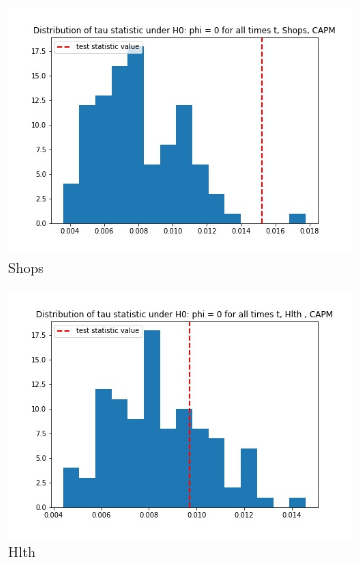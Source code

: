 \documentclass{article}
\begin{document}
\begin{figure}
  
  \begin{subfigure}[b]{0.5\textwidth}
    \centering
    \includegraphics[width=\textwidth]{Shops/tau_hist_02_CAPM.jpg}
    \caption{Shops}
    \label{fig:2}
  \end{subfigure}
  \begin{subfigure}[b]{0.5\textwidth}
    \centering
    \includegraphics[width=\textwidth]{Hlth/tau_hist_02_CAPM.jpg}
    \caption{Hlth}
    \label{fig:2}
  \end{subfigure}
  \begin{subfigure}[b]{0.5\textwidth}
    \centering

\end{subfigure}
\end{figure}
\end{document}

